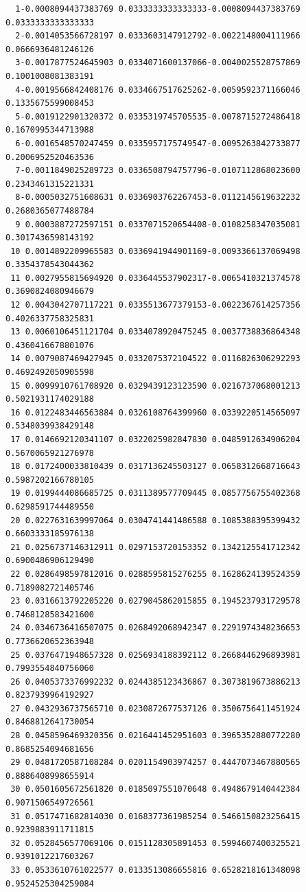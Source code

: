 \begin{verbatim}
  1-0.0008094437383769 0.0333333333333333-0.0008094437383769 0.0333333333333333
  2-0.0014053566728197 0.0333603147912792-0.0022148004111966 0.0666936481246126
  3-0.0017877524645903 0.0334071600137066-0.0040025528757869 0.1001008081383191
  4-0.0019566842408176 0.0334667517625262-0.0059592371166046 0.1335675599008453
  5-0.0019122901320372 0.0335319745705535-0.0078715272486418 0.1670995344713988
  6-0.0016548570247459 0.0335957175749547-0.0095263842733877 0.2006952520463536
  7-0.0011849025289723 0.0336508794757796-0.0107112868023600 0.2343461315221331
  8-0.0005032751608631 0.0336903762267453-0.0112145619632232 0.2680365077488784
  9 0.0003887272597151 0.0337071520654408-0.0108258347035081 0.3017436598143192
 10 0.0014892209965583 0.0336941944901169-0.0093366137069498 0.3354378543044362
 11 0.0027955815694920 0.0336445537902317-0.0065410321374578 0.3690824080946679
 12 0.0043042707117221 0.0335513677379153-0.0022367614257356 0.4026337758325831
 13 0.0060106451121704 0.0334078920475245 0.0037738836864348 0.4360416678801076
 14 0.0079087469427945 0.0332075372104522 0.0116826306292293 0.4692492050905598
 15 0.0099910761708920 0.0329439123123590 0.0216737068001213 0.5021931174029188
 16 0.0122483446563884 0.0326108764399960 0.0339220514565097 0.5348039938429148
 17 0.0146692120341107 0.0322025982847830 0.0485912634906204 0.5670065921276978
 18 0.0172400033810439 0.0317136245503127 0.0658312668716643 0.5987202166780105
 19 0.0199444086685725 0.0311389577709445 0.0857756755402368 0.6298591744489550
 20 0.0227631639997064 0.0304741441486588 0.1085388395399432 0.6603333185976138
 21 0.0256737146312911 0.0297153720153352 0.1342125541712342 0.6900486906129490
 22 0.0286498597812016 0.0288595815276255 0.1628624139524359 0.7189082721405746
 23 0.0316613792205220 0.0279045862015855 0.1945237931729578 0.7468128583421600
 24 0.0346736416507075 0.0268492068942347 0.2291974348236653 0.7736620652363948
 25 0.0376471948657328 0.0256934188392112 0.2668446296893981 0.7993554840756060
 26 0.0405373376992232 0.0244385123436867 0.3073819673886213 0.8237939964192927
 27 0.0432936737565710 0.0230872677537126 0.3506756411451924 0.8468812641730054
 28 0.0458596469320356 0.0216441452951603 0.3965352880772280 0.8685254094681656
 29 0.0481720587108284 0.0201154903974257 0.4447073467880565 0.8886408998655914
 30 0.0501605672561820 0.0185097551070648 0.4948679140442384 0.9071506549726561
 31 0.0517471682814030 0.0168377361985254 0.5466150823256415 0.9239883911711815
 32 0.0528456577069106 0.0151128305891453 0.5994607400325521 0.9391012217603267
 33 0.0533610761022577 0.0133513086655816 0.6528218161348098 0.9524525304259084

\end{verbatim}
